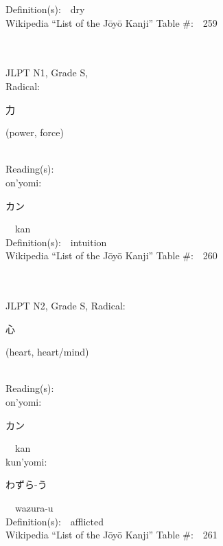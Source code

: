 \begin{multicols}{2}
Definition(s):\ \ dry \\
Wikipedia ``List of the J\=oy\=o Kanji'' Table \#:\ \ 259 \\
\ \ \\
{\fontsize{34pt}{40pt}  }\ \ \\
{JLPT N1, Grade S, \\Radical:\ \ {\begin{CJK}{UTF8}{min} 力 \end{CJK}} (power, force) } \\
Reading(s):\ \ \\
{\hspace*{1em}}on'yomi:\ \ \\
{\hspace*{2em}}{\begin{CJK}{UTF8}{min} カン \end{CJK}}\ \ kan\ \ \\
Definition(s):\ \ intuition \\
Wikipedia ``List of the J\=oy\=o Kanji'' Table \#:\ \ 260 \\
\ \ \\
{\fontsize{34pt}{40pt}  }\ \ \\  %
{JLPT N2, Grade S, Radical:\ \ {\begin{CJK}{UTF8}{min} 心 \end{CJK}} (heart, heart/mind) } \\
Reading(s):\ \ \\
{\hspace*{1em}}on'yomi:\ \ \\
{\hspace*{2em}}{\begin{CJK}{UTF8}{min} カン \end{CJK}}\ \ kan\ \ \\
{\hspace*{1em}}kun'yomi:\ \ \\
{\hspace*{2em}}{\begin{CJK}{UTF8}{min} わずら-う \end{CJK}}\ \ wazura-u\ \ \\
Definition(s):\ \ afflicted \\
Wikipedia ``List of the J\=oy\=o Kanji'' Table \#:\ \ 261 \\

\end{multicols}
